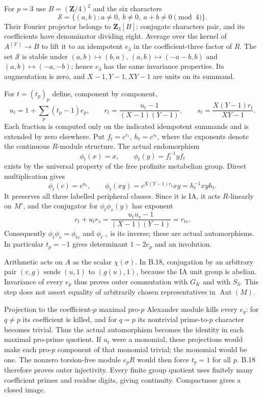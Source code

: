 For $p=3$ use $B=(\mathbf Z/4)^2$ and the six characters
\[
 \mathcal S=\{(a,b):a\ne0,\ b\ne0,\ a+b\ne0\pmod4\}.
\]
Their Fourier projector belongs to $\mathbf Z_3[B]$: conjugate
characters pair, and its coefficients have denominator dividing
eight. Average over the kernel of $A^{(3')}\to B$ to lift it
to an idempotent $e_3$ in the coefficient-three factor of $R$.
The set $\mathcal S$ is stable under $(a,b)\mapsto(b,a)$,
$(a,b)\mapsto(-a-b,b)$ and $(a,b)\mapsto(-a,-b)$; hence $e_3$
has the same invariance properties. Its augmentation is zero,
and $X-1,Y-1,XY-1$ are units on its summand.

For $t=(t_p)_p$ define, component by component,
\[
 u_t=1+\sum_p(t_p-1)e_p,\qquad
 r_t=\frac{u_t-1}{(X-1)(Y-1)},\qquad
 s_t=\frac{X(Y-1)r_t}{XY-1}.
\]
Each fraction is computed only on the indicated idempotent
summands and is extended by zero elsewhere. Put
$f_t=c^{r_t}$, $h_t=c^{s_t}$, where the exponents denote the
continuous $R$-module structure. The actual endomorphism
\[
 \phi_t(x)=x,\qquad \phi_t(y)=f_t^{-1}yf_t
\]
exists by the universal property of the free profinite
metabelian group. Direct multiplication gives
\[
 \phi_t(c)=c^{u_t},\qquad
 \phi_t(xy)=c^{X(Y-1)r_t}xy=h_t^{-1}xyh_t.
\]
It preserves all three labelled peripheral classes. Since it
is IA, it acts $R$-linearly on $M'$, and the conjugator for
$\phi_t\phi_v(y)$ has exponent
\[
 r_t+u_tr_v
   =\frac{u_tu_v-1}{(X-1)(Y-1)}=r_{tv}.
\]
Consequently $\phi_t\phi_v=\phi_{tv}$ and $\phi_{t^{-1}}$
is its inverse; these are actual automorphisms. In particular
$t_p=-1$ gives determinant $1-2e_p$ and an involution.

Arithmetic acts on $A$ as the scalar $\chi(\sigma)$. In B.18,
conjugation by an arbitrary pair $(v,g)$ sends $(u,1)$ to
$(g(u),1)$, because the IA unit group is abelian. Invariance
of every $e_p$ thus proves outer commutation with $G_K$ and
with $S_3$. This step does not assert equality of arbitrarily
chosen representatives in $\operatorname{Aut}(M)$.

Projection to the coefficient-$p$ maximal pro-$p$ Alexander
module kills every $e_q$: for $q\ne p$ its coefficient is
killed, and for $q=p$ its nontrivial prime-to-$p$ character
becomes trivial. Thus the actual automorphism becomes the
identity in each maximal pro-prime quotient. If $u_t$ were a
monomial, these projections would make each pro-$p$ component
of that monomial trivial; the monomial would be one. The
nonzero torsion-free module $e_pR$ would then force $t_p=1$
for all $p$. B.18 therefore proves outer injectivity. Every
finite group quotient uses finitely many coefficient primes
and residue digits, giving continuity. Compactness gives a
closed image.

